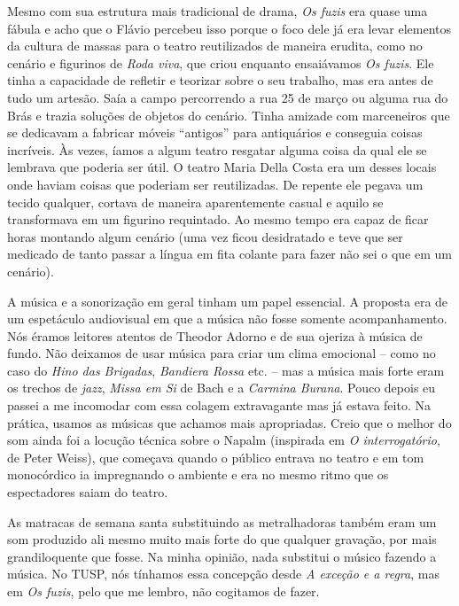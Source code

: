 Mesmo com sua estrutura mais tradicional de drama, \textit{Os fuzis} era
quase uma fábula e acho que o Flávio percebeu isso porque o foco dele já
era levar elementos da cultura de massas para o teatro reutilizados de
maneira erudita, como no cenário e figurinos de \textit{Roda viva}, que
criou enquanto ensaiávamos \textit{Os fuzis}. Ele tinha a capacidade de
refletir e teorizar sobre o seu trabalho, mas era antes de tudo um
artesão. Saía a campo percorrendo a rua 25 de março ou alguma rua do
Brás e trazia soluções de objetos do cenário. Tinha amizade com
marceneiros que se dedicavam a fabricar móveis “antigos” para
antiquários e conseguia coisas incríveis. Às vezes, íamos a algum teatro
resgatar alguma coisa da qual ele se lembrava que poderia ser útil. O
teatro Maria Della Costa era um desses locais onde haviam coisas que
poderiam ser reutilizadas. De repente ele pegava um tecido qualquer,
cortava de maneira aparentemente casual e aquilo se transformava em um
figurino requintado. Ao mesmo tempo era capaz de ficar horas montando
algum cenário (uma vez ficou desidratado e teve que ser medicado de
tanto passar a língua em fita colante para fazer não sei o que em um
cenário).

A música e a sonorização em geral tinham um papel essencial. A proposta
era de um espetáculo audiovisual em que a música não fosse somente
acompanhamento. Nós éramos leitores atentos de Theodor Adorno e de sua
ojeriza à música de fundo. Não deixamos de usar música para criar um
clima emocional -- como no caso do \textit{Hino das Brigadas},
\textit{Bandiera Rossa} etc. -- mas a música mais forte eram os trechos de
\textit{jazz}, \textit{Missa em Si} de Bach e a \textit{Carmina Burana}. Pouco
depois eu passei a me incomodar com essa colagem extravagante mas já
estava feito. Na prática, usamos as músicas que achamos mais
apropriadas. Creio que o melhor do som ainda foi a locução técnica sobre
o Napalm (inspirada em \textit{O interrogatório}, de Peter Weiss), que
começava quando o público entrava no teatro e em tom monocórdico ia
impregnando o ambiente e era no mesmo ritmo que os espectadores saiam do
teatro.

As matracas de semana santa substituindo as metralhadoras também eram um
som produzido ali mesmo muito mais forte do que qualquer gravação, por
mais grandiloquente que fosse. Na minha opinião, nada substitui o músico
fazendo a música. No TUSP, nós tínhamos essa concepção desde \textit{A
exceção e a regra}, mas em \textit{Os fuzis}, pelo que me lembro, não
cogitamos de fazer.

